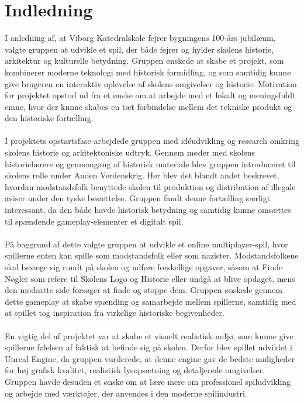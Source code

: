 \section{Indledning}
I anledning af, at Viborg Katedralskole fejrer bygningens 100-års jubilæum,
valgte gruppen at udvikle et spil, der både fejrer og hylder skolens historie,
arkitektur og kulturelle betydning. Gruppen ønskede at skabe et projekt,
som kombinerer moderne teknologi med historisk formidling, og
som samtidig kunne give brugeren en interaktiv oplevelse af skolens omgivelser og historie.
Motivation for projektet opstod ud fra et ønske om at arbejde med et lokalt og meningsfuldt emne,
hvor der kunne skabes en tæt forbindelse mellem det tekniske produkt og den historiske fortælling.
\\\\
I projektets opstartsfase arbejdede gruppen med idéudvikling og research omkring skolens historie
og arkitektoniske udtryk. Gennem møder med skolens historielærere og gennemgang af historisk
materiale blev gruppen introduceret til skolens rolle under Anden Verdenskrig.
Her blev det blandt andet beskrevet,
hvordan modstandsfolk benyttede skolen til produktion og distribution af illegale aviser
under den tyske besættelse. Gruppen fandt denne fortælling særligt interessant,
da den både havde historisk betydning og samtidig kunne omsættes til spændende gameplay-elementer
 et digitalt spil.
\\\\
På baggrund af dette valgte gruppen at udvikle et online multiplayer-spil,
hvor spillerne enten kan spille som modstandsfolk eller som nazister.
Modstandsfolkene skal bevæge sig rundt på skolen og udføre forskellige opgaver,
såsom at Finde Nøgler som refere til Skolens Logo og Historie eller undgå at blive opdaget,
mens den modsatte side forsøger at finde og stoppe dem.
Gruppen ønskede gennem dette gameplay at skabe spænding og samarbejde mellem spillerne,
samtidig med at spillet tog inspiration fra virkelige historiske begivenheder.
\\\\
En vigtig del af projektet var at skabe et visuelt realistisk miljø,
som kunne give spillerne følelsen af faktisk at befinde sig på skolen.
Derfor blev spillet udviklet i Unreal Engine, da gruppen vurderede,
at denne engine gav de bedste muligheder for høj grafisk kvalitet,
realistisk lysopsætning og detaljerede omgivelser.
Gruppen havde desuden et ønske om at lære mere om professionel spiludvikling og arbejde med værktøjer,
der anvendes i den moderne spilindustri.
